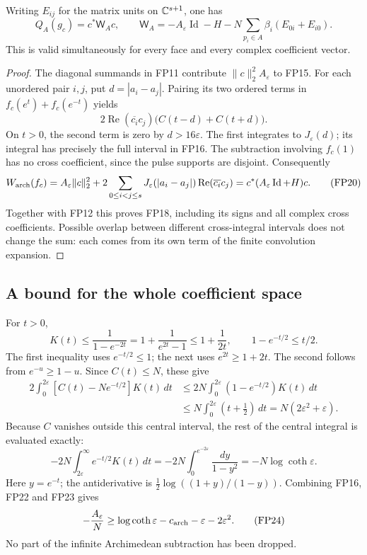 \begin{theorem}
\label{fp:thm:matrix}
Writing \(E_{ij}\) for the matrix units on \(\mathbb C^{s+1}\), one has
\[
 \boxed{\quad
 Q_A(g_c)=c^*\mathsf W_Ac,\qquad
 \mathsf W_A=-A_\varepsilon\operatorname{Id}-H
       -N\sum_{p_i\in A}\beta_i(E_{0i}+E_{i0}).
 \quad}
 \tag{FP18}\label{fp:fpb:matrix}
\]
This is valid simultaneously for every face and every complex
coefficient vector.
\end{theorem}
\begin{proof}
The diagonal summands in FP11 contribute
\(\|c\|_2^2 A_\varepsilon\) to FP15. For each unordered pair \(i,j\),
put \(d=|a_i-a_j|\). Pairing its two ordered terms in
\(f_c(e^t)+f_c(e^{-t})\) yields
\[
 2\operatorname{Re}(\overline{c_i}c_j)
                 \bigl(C(t-d)+C(t+d)\bigr).
 \tag{FP19}
\]
On \(t>0\), the second term is zero by \(d>16\varepsilon\).
The first integrates to \(J_\varepsilon(d)\); its integral has precisely
the full interval in FP16. The subtraction involving \(f_c(1)\)
has no cross coefficient, since the pulse supports are disjoint.
Consequently
\[
 W_{\rm arch}(f_c)
  =A_\varepsilon\|c\|_2^2+
      2\sum_{0\le i<j\le s}
          J_\varepsilon(|a_i-a_j|)\operatorname{Re}(\overline{c_i}c_j)
  =c^*(A_\varepsilon\operatorname{Id}+H)c.
 \tag{FP20}
\]
Together with FP12 this proves FP18, including its signs and
all complex cross coefficients. Possible overlap between different
cross-integral intervals does not change the sum: each comes
from its own term of the finite convolution expansion.
\end{proof}

\subsection{A bound for the whole coefficient space}

For \(t>0\),
\[
 K(t)\le\frac1{1-e^{-2t}}
   =1+\frac1{e^{2t}-1}\le1+\frac1{2t},
 \qquad 1-e^{-t/2}\le t/2.
 \tag{FP21}\label{fp:fpb:kernel-bound}
\]
The first inequality uses \(e^{-t/2}\le1\); the next uses
\(e^{2t}\ge1+2t\). The second follows from \(e^{-u}\ge1-u\).
Since \(C(t)\le N\), these give
\[
 \begin{aligned}
 2\int_0^{2\varepsilon}[C(t)-Ne^{-t/2}]K(t)\,dt
 &\le2N\int_0^{2\varepsilon}(1-e^{-t/2})K(t)\,dt\\
 &\le N\int_0^{2\varepsilon}(t+\tfrac12)\,dt
   =N(2\varepsilon^2+\varepsilon).
 \end{aligned}
 \tag{FP22}
\]
Because \(C\) vanishes outside this central interval, the rest of
the central integral is evaluated exactly:
\[
 -2N\int_{2\varepsilon}^\infty e^{-t/2}K(t)\,dt
   =-2N\int_0^{e^{-2\varepsilon}}\frac{dy}{1-y^2}
   =-N\log\coth\varepsilon .
 \tag{FP23}\label{fp:fpb:tail}
\]
Here \(y=e^{-t}\); the antiderivative is
\(\tfrac12\log((1+y)/(1-y))\).
Combining FP16, FP22 and FP23 gives
\[
 -\frac{A_\varepsilon}{N}
 \ge\log\coth\varepsilon-c_{\rm arch}-\varepsilon-2\varepsilon^2.
 \tag{FP24}\label{fp:fpb:central-bound}
\]
No part of the infinite Archimedean subtraction has been dropped.

